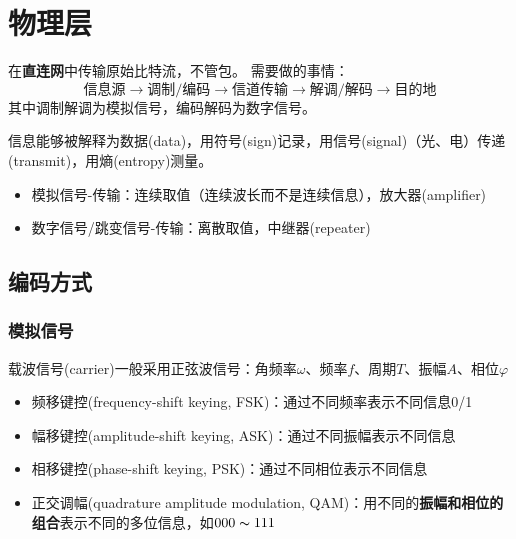 
\section{物理层}
在\textbf{直连网}中传输原始比特流，不管包。
需要做的事情：
\[\text{信息源}\to\text{调制/编码}\to\text{信道传输}\to\text{解调/解码}\to\text{目的地}\]
其中调制解调为模拟信号，编码解码为数字信号。

信息能够被解释为数据(data)，用符号(sign)记录，用信号(signal)（光、电）传递(transmit)，用熵(entropy)测量。
\begin{itemize}
	\item 模拟信号-传输：连续取值（连续波长而不是连续信息），放大器(amplifier)
	\item 数字信号/跳变信号-传输：离散取值，中继器(repeater)
\end{itemize}

\subsection{编码方式}
\subsubsection{模拟信号}
载波信号(carrier)一般采用正弦波信号：角频率$\omega$、频率$f$、周期$T$、振幅$A$、相位$\varphi$
\begin{itemize}
	\item 频移键控(frequency-shift keying, FSK)：通过不同频率表示不同信息0/1
	\item 幅移键控(amplitude-shift keying, ASK)：通过不同振幅表示不同信息
	\item 相移键控(phase-shift keying, PSK)：通过不同相位表示不同信息
	\item 正交调幅(quadrature amplitude modulation, QAM)：用不同的\textbf{振幅和相位的组合}表示不同的多位信息，如$000\thicksim 111$
\end{itemize}

